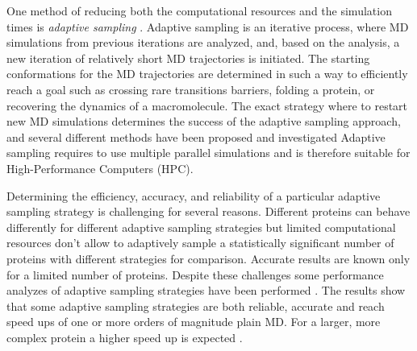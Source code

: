 One method of reducing both the computational resources and the simulation times is \emph{adaptive sampling} \cite{singhal2005error, bowman2010enhanced,
weber2011characterization, Fabritiis-2014, preto2014fast, doerr2016htmd,
AdaptivePELE-Lecina2017, EvolutionCoupling-Shamsi2017, FAST-Bowman-2015, 
Strategies-erros-reduce, plattner2017complete, Adstrategies2018}. 
Adaptive sampling is an iterative process, where MD simulations from previous
iterations are analyzed, and, based on the analysis, a new iteration of relatively
short MD trajectories is initiated. The starting conformations for the
MD trajectories are determined in such a way to efficiently
reach a goal such as crossing rare transitions barriers, folding a protein, or
recovering the dynamics of a macromolecule. The exact strategy where to restart
new MD simulations determines the success of the adaptive sampling approach,
and several different methods have been proposed and investigated Adaptive sampling
requires to use multiple parallel simulations and is therefore suitable for
High-Performance Computers (HPC).

Determining the efficiency, accuracy, and reliability of a particular adaptive
sampling strategy is challenging for several reasons. Different proteins can
behave differently for different adaptive sampling strategies but limited
computational resources don't allow to adaptively sample a statistically
significant number of proteins with different strategies for comparison.
Accurate results are known only for a limited number of proteins. Despite
these challenges some performance analyzes of adaptive sampling strategies
have been performed
\cite{preto2014fast,weber2011characterization,bowman2010enhanced,Fabritiis-2014,
Adstrategies2018}. The results show that some adaptive sampling strategies are
both reliable, accurate and reach speed ups of one or more orders of magnitude
 plain MD. For a larger, more complex protein a higher speed up is expected \cite{Adstrategies2018}.

